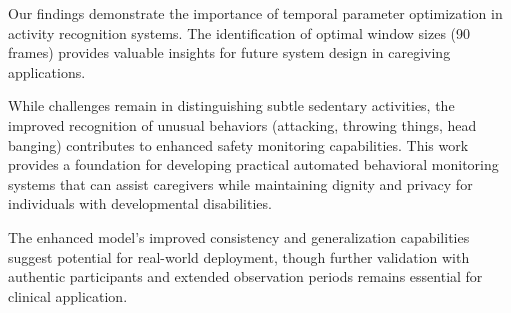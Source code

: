\documentclass[a4paper,11pt]{article}
\begin{document}
Our findings demonstrate the importance of temporal parameter optimization in activity recognition systems. The identification of optimal window sizes (90 frames) provides valuable insights for future system design in caregiving applications.

While challenges remain in distinguishing subtle sedentary activities, the improved recognition of unusual behaviors (attacking, throwing things, head banging) contributes to enhanced safety monitoring capabilities. This work provides a foundation for developing practical automated behavioral monitoring systems that can assist caregivers while maintaining dignity and privacy for individuals with developmental disabilities.

The enhanced model's improved consistency and generalization capabilities suggest potential for real-world deployment, though further validation with authentic participants and extended observation periods remains essential for clinical application.



\end{document}

